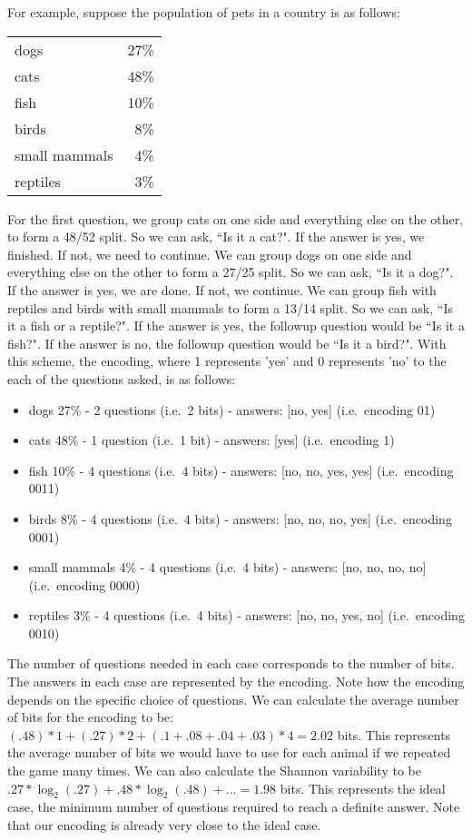 \documentclass[prb, twocolumn]{revtex4-1}
\begin{document}
For example, suppose the population of pets in a country is as follows:
\begin{table}[h]
\begin{tabular}{lr}
dogs & 27\% \\
cats & 48\% \\
fish & 10\% \\
birds & 8\% \\
small mammals & 4\% \\
reptiles & 3\%
\end{tabular}
\end{table}

\noindent
For the first question, we group cats on one side and everything else on the other, to form a 48/52 split. So we can ask, ``Is it a cat?". If the answer is yes, we finished. If not, we need to continue. We can group dogs on one side and everything else on the other to form a 27/25 split. So we can ask, ``Is it a dog?". If the answer is yes, we are done. If not, we continue. We can group fish with reptiles and birds with small mammals to form a 13/14 split. So we can ask, ``Is it a fish or a reptile?". If the answer is yes, the followup question would be ``Is it a fish?". If the answer is no, the followup question would be ``Is it a bird?". With this scheme, the encoding, where 1 represents 'yes' and 0 represents 'no' to the each of the questions asked, is as follows:
\begin{itemize}
\item dogs 27\% - 2 questions (i.e.~2 bits) - answers: [no, yes] (i.e.~encoding 01)
\item cats 48\% - 1 question (i.e.~1 bit) - answers: [yes] (i.e.~encoding 1)
\item fish 10\% - 4 questions (i.e.~4 bits) - answers: [no, no, yes, yes] (i.e.~encoding 0011)
\item birds 8\% - 4 questions (i.e.~4 bits) - answers: [no, no, no, yes] (i.e.~encoding 0001)
\item small mammals 4\% - 4 questions (i.e.~4 bits) - answers: [no, no, no, no] (i.e.~encoding 0000)
\item reptiles 3\% - 4 questions (i.e.~4 bits) - answers: [no, no, yes, no] (i.e.~encoding 0010)
\end{itemize}
The number of questions needed in each case corresponds to the number of bits. The answers in each case are represented by the encoding. Note how the encoding depends on the specific choice of questions. We can calculate the average number of bits for the encoding to be:  $(.48) * 1 + (.27) * 2 + (.1 + .08 + .04 + .03) * 4 = 2.02$ bits. This represents the average number of bits we would have to use for each animal if we repeated the game many times. We can also calculate the Shannon variability to be $.27 * \log_2(.27) + .48 * \log_2 (.48) + ... =1.98$ bits. This represents the ideal case, the minimum number of questions required to reach a definite answer. Note that our encoding is already very close to the ideal case.
\end{document}
